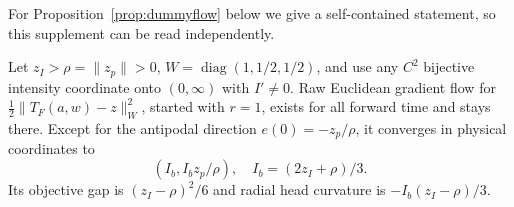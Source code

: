 For Proposition~\ref{prop:dummyflow} below we give a self-contained statement, so this supplement can be read independently.
\begin{proposition}
\label{prop:dummyflow}
Let $z_I>\rho=\|z_p\|>0$, $W=\operatorname{diag}(1,1/2,1/2)$, and use any $C^2$ bijective intensity coordinate onto $(0,\infty)$ with $I'\ne0$. Raw Euclidean gradient flow for $\tfrac12\|T_F(a,w)-z\|_W^2$, started with $r=1$, exists for all forward time and stays there. Except for the antipodal direction $e(0)=-z_p/\rho$, it converges in physical coordinates to
\begin{equation}
 (I_b,I_b z_p/\rho),\quad I_b=(2z_I+\rho)/3.
\end{equation}
Its objective gap is $(z_I-\rho)^2/6$ and radial head curvature is $-I_b(z_I-\rho)/3$.
\end{proposition}

